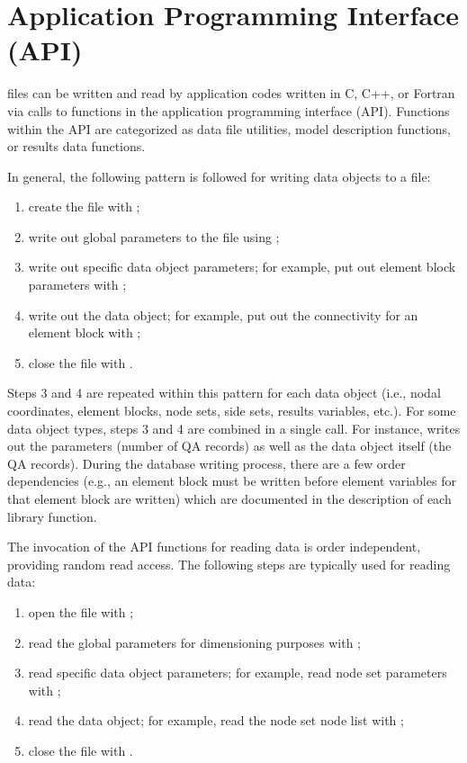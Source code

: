 \chapter{Application Programming Interface (API)}


\exo{} files can be written and read by application codes 
written in C, C++, or Fortran via calls to functions in the application 
programming interface (API). Functions within the API are categorized 
as data file utilities, model description functions, or results 
data functions. 

In general, the following pattern is followed for writing 
data objects to a file:

\begin{enumerate}
\item create the file with ;
\item write out global parameters to the file using ;
\item write out specific data object parameters; for example, 
put out element block parameters with ;
\item write out the data object; for example, put out the connectivity 
for an element block with ;
\item close the file with .
\end{enumerate}

Steps 3 and 4 are repeated within this pattern for each data object
(i.e., nodal coordinates, element blocks, node sets, side sets,
results variables, etc.). For some data object types, steps 3 and 4
are combined in a single call. For instance, 
writes out the parameters (number of QA records) as well as the data
object itself (the QA records). During the database writing process,
there are a few order dependencies (e.g., an element block must be
written before element variables for that element block are written)
which are documented in the description of each library function.


The invocation of the \exo{} API functions for reading 
data is order independent, providing random read access. The 
following steps are typically used for reading data:

\begin{enumerate}

\item open the file with ;

\item read the global parameters for dimensioning purposes with
;

\item read specific data object parameters; for example, read 
node set parameters with ;

\item read the data object; for example, read the node set node 
list with ;

\item close the file with .
\end{enumerate}

